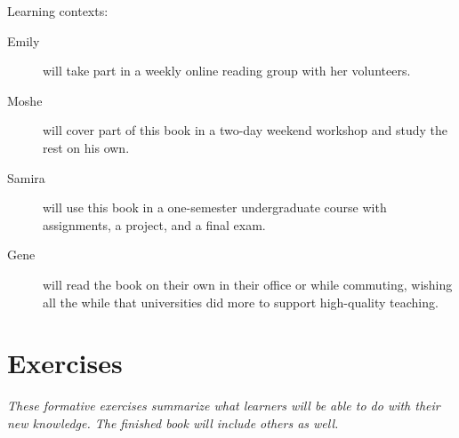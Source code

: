 \noindent
Learning contexts:

\begin{description}

  \item[Emily] will take part in a weekly online reading group with
    her volunteers.

  \item[Moshe] will cover part of this book in a two-day weekend
    workshop and study the rest on his own.

  \item[Samira] will use this book in a one-semester undergraduate
    course with assignments, a project, and a final exam.

  \item[Gene] will read the book on their own in their office or
    while commuting, wishing all the while that universities did more
    to support high-quality teaching.

\end{description}

\section*{Exercises}

\emph{These formative exercises summarize what learners will be able
  to do with their new knowledge. The finished book will include
  others as well.}

